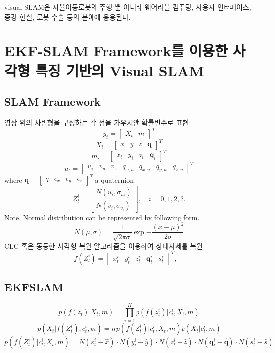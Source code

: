 \documentclass[master,korean,final]{cbnu-ecs}
\begin{document}
visual SLAM은 자율이동로봇의 주행 뿐 아니라 웨어러블 컴퓨팅, 사용자 인터페이스, 증강 현실, 로봇 수술 등의 분야에 응용된다. 


\chapter{EKF-SLAM Framework를 이용한 사각형 특징 기반의 Visual SLAM}

\section{SLAM Framework}
영상 위의 사변형을 구성하는 각 점을 가우시안 확률변수로 표현
\[
y_t=\begin{bmatrix}
X_t & m
\end{bmatrix}^T
\]
\[
X_t=\begin{bmatrix}
x & y & z & \textbf{q}
\end{bmatrix}^T
\]
\[
m_i=\begin{bmatrix}
x_i & y_i & z_i & \textbf{q}_i
\end{bmatrix}^T
\]
\[
u_t=\begin{bmatrix}
v_x & v_y & v_z &  q_{\omega,u} &  q_{x,u} &  q_{y,u} & q_{z,u}
\end{bmatrix}^T
\]
where $\textbf{q}=\begin{bmatrix}\eta & \epsilon_x & \epsilon_y & \epsilon_z\end{bmatrix}^T $ a quaternion 
\[
Z_t^i = \begin{bmatrix}N(u_i, \sigma_{u_i}) \\ N(v_i, \sigma_{v{_i}})\end{bmatrix}, \quad i=0,1,2,3.
\]
Note. Normal distribution can be represented by following form,
\[
N(\mu,\sigma)=\frac{1}{\sqrt{2\pi\sigma}}\exp{-\frac{(x-\mu)^2}{2\sigma}}
\]
CLC 혹은 동등한 사각형 복원 알고리즘을 이용하여 상대자세를 복원
\[
f(Z_t^i)=\begin{bmatrix} x_t^i & y_t^i & z_t^i & \textbf{q}_t^i & s_t^i \end{bmatrix}^T, \quad
\]


\section{EKFSLAM}
\[
p(f(z_t) | X_t ,m)=\prod^K_{i=1}p(f(z_t^i) | c_t^i, X_t, m)
\]
\[ 
p(X_t | f(Z_t^i), c_t^i, m) = \eta \, p(f(Z_t^i) | c_t^i, X_t, m)p(X_t | c_t^i, m)
\]
\[
p(f(Z_t^i) | c_t^i, X_t, m) = N(x_t^i-\hat{x})\cdot N(y_t^i-\hat{y})\cdot N(z_t^i-\hat{z})\cdot N(\textbf{q}_t^i-\hat{\textbf{q}}) \cdot N(s_t^i-\hat{s})
\]
\end{document}
